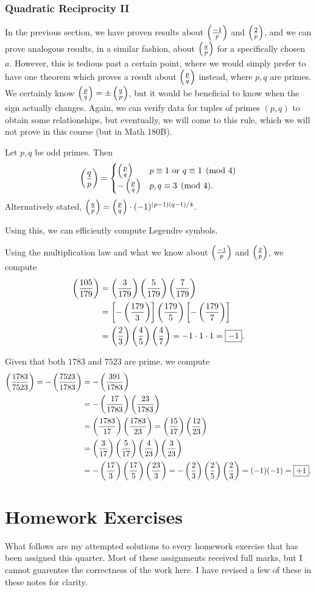 \documentclass{article}
\newcommand{\leg}[2]{\paren{\frac{#1}{#2}}}
\begin{document}
\setcounter{section}{103}
\section{Quadratic Reciprocity II}
In the previous section, we have proven results about $\leg{-1}p$ and $\leg 2p$, and we can prove analogous results, in a similar fashion, about $\leg ap$ for a specifically chosen $a$. However, this is tedious past a certain point, where we would simply prefer to have one theorem which proves a result about $\leg pq$ instead, where $p,q$ are primes. We certainly know $\leg pq = \pm \leg qp$, but it would be beneficial to know when the sign actually changes. Again, we can verify data for tuples of primes $(p, q)$ to obtain some relationships, but eventually, we will come to this rule, which we will not prove in this course (but in Math 180B).
\begin{theorem}
Let $p,q$ be odd primes. Then
$$\leg qp = \begin{cases}
    \leg pq & p\equiv1 \text{ or } q\equiv1 \pmod 4 \\
    -\leg pq & p,q\equiv 3\pmod 4.
\end{cases}$$
Alternatively stated, $\leg qp = \leg pq \cdot (-1)^{(p-1)(q-1)/4}$.
\end{theorem}

Using this, we can efficiently compute Legendre symbols.
\begin{example}
Using the multiplication law and what we know about $\leg{-1}p$ and $\leg 2p$, we compute
\begin{align*}
    \leg{105}{179} &= \leg{3}{179} \leg 5{179} \leg7 {179} \\
    &= \brak{-\leg{179}3} \leg{179}5\brak{-\leg{179}7}\\
    &= \leg 23\leg 45\leg 47 = -1\cdot 1\cdot 1 = \boxed{-1}.
\end{align*}
\end{example}

\begin{example}
Given that both $1783$ and $7523$ are prime, we compute
\begin{align*}
    \leg{1783}{7523} = -\leg{7523}{1783} &= -\leg{391}{1783} \\
    &= -\leg{17}{1783}\leg{23}{1783} \\
    &= \leg{1783}{17}\leg{1783}{23} = \leg{15}{17}\leg{12}{23} \\
    &= \leg 3{17}\leg5{17}\leg 4{23}\leg{3}{23} \\
    &= -\leg{17}3\leg{17}5\leg{23}3 = -\leg 23\leg 25 \leg 23 = (-1)(-1) = \boxed{+1}.
\end{align*}

\newpage
\part*{Homework Exercises}
What follows are my attempted solutions to every homework exercise that has been assigned this quarter. Most of these assignments received full marks, but I cannot guarentee the correctness of the work here. I have revised a few of these in these notes for clarity.
\end{example}
\end{document}

